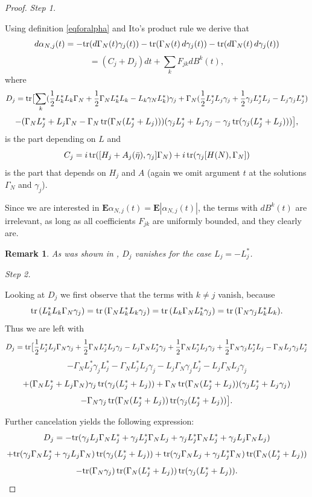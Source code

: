 \documentclass[12pt]{article}
\def\E{\mathbf{E}}
\def\tr{\rm{tr}}
\def\al{\alpha}
\def\ga{\gamma}
\newtheorem{remark}{Remark}
\newcommand{\Ga}{\Gamma}
\begin{document}
\begin{proof}

{\it Step 1.}

Using definition \eqref{eqforalpha}  and Ito's product rule we derive that
\[
d \al_{N,j}(t)=-{\tr} (d\Ga_N(t) \ga_j(t))-{\tr} (\Ga_N(t) \, d \ga_j(t))-{\tr} (d\Ga_N(t) \, d \ga_j(t))
\]
\begin{equation}
\label{eqforalphaconder}
=(C_j+D_j)dt+\sum_k F_{jk} dB^k(t),
\end{equation}
where
\[
D_j={\tr} \bigl[ \sum_k (\frac12 L^*_k L_k\Ga_N +\frac12 \Ga_N L_k^*L_k-L_k \ga_N L_k^*)\ga_j
+\Ga_N (\frac12 L^*_j L_j \ga_j +\frac12 \ga_j L_j^*L_j-L_j \ga_j L_j^*)
\]
\[
-(\Ga_N L_j^*+L_j \Ga_N -\Ga_N \, {\tr} (\Ga_N(L_j^*+L_j)))(\ga_j L_j^*
+L_j \ga_j -\ga_j \, {\tr} (\ga_j(L_j^*+L_j)))\bigr],
\]
is the part depending on $L$ and
\[
C_j= i \, {\tr} ([H_j+A_j(\bar \eta),\ga_j]\Ga_N)
 +i \, {\tr} (\ga_j [H(N),\Ga_N])
 \]
is the part that depends on $H_j$ and $A$ (again we omit argument $t$ at the solutions $\Ga_N$ and $\ga_j$).

Since we are interested in $\E \al_{N,j}(t)=\E |\al_{N,j}(t)|$,
the terms with $dB^k(t)$ are irrelevant, as long as
all coefficients $F_{jk}$ are uniformly bounded, and they clearly are.

\begin{remark}
As was shown in \cite{KolQuantMFG}, $D_j$ vanishes for the case $L_j=-L_j^*$.
\end{remark}

{\it Step 2.}

Looking at $D_j$ we first observe that the terms with $k\neq j$ vanish, because
\[
{\tr} \, (L_k^*L_k \Ga_N \ga_j)={\tr} \, (\Ga_N L_k^*L_k \ga_j)
={\tr} \, (L_k \Ga_N L_k^*\ga_j)={\tr} \, (\Ga_N \ga_jL_k^*L_k).
\]
Thus we are left with
\[
D_j={\tr} \bigl[  \frac12 L^*_j L_j\Ga_N \ga_j +\frac12 \Ga_N L_j^*L_j\ga_j-L_j \Ga_N L_j^*\ga_j
+\frac12 \Ga_N L^*_j L_j \ga_j +\frac12 \Ga_N\ga_j L_j^*L_j-\Ga_NL_j \ga_j L_j^*
\]
\[
-\Ga_N L_j^*\ga_j L_j^*-\Ga_N L_j^*L_j \ga_j-L_j \Ga_N \ga_j L_j^*-L_j \Ga_N L_j\ga_j
\]
\[
+(\Ga_N L_j^*+L_j \Ga_N)\ga_j \, {\tr} (\ga_j(L_j^*+L_j))
+\Ga_N \, {\tr} (\Ga_N(L_j^*+L_j))(\ga_j L_j^*+L_j \ga_j)
\]
\[
-\Ga_N \ga_j\, {\tr} (\Ga_N(L_j^*+L_j))\, {\tr} (\ga_j(L_j^*+L_j))\bigr].
\]

Further cancelation yields the following expression:
\[
D_j=-{\tr} (\ga_j L_j \Ga_N L_j^*+\ga_j L_j^* \Ga_N L_j +\ga_j L_j^*\Ga_N L_j^*+\ga_j L_j \Ga_N L_j)
\]
\[
+ {\tr} (\ga_j\Ga_N L_j^*+\ga_j L_j \Ga_N) \, {\tr} (\ga_j(L_j^*+L_j))
+ {\tr} (\ga_j \Ga_N L_j+ \ga_j L_j^* \Ga_N) \, {\tr} (\Ga_N(L_j^*+L_j))
\]
\[
-{\tr} (\Ga_N \ga_j)\, {\tr} (\Ga_N(L_j^*+L_j))\, {\tr} (\ga_j(L_j^*+L_j)).
\]


\end{proof}
\end{document}

